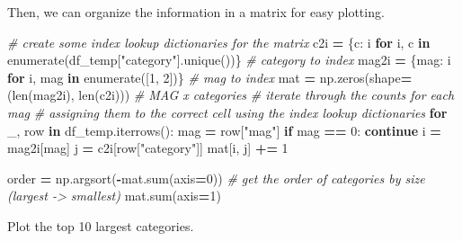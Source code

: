 \documentclass[
]{book}
\newenvironment{Shaded}{\begin{snugshade}}{\end{snugshade}}
\newcommand{\BuiltInTok}[1]{#1}
\newcommand{\CommentTok}[1]{\textcolor[rgb]{0.56,0.35,0.01}{\textit{#1}}}
\newcommand{\ControlFlowTok}[1]{\textcolor[rgb]{0.13,0.29,0.53}{\textbf{#1}}}
\newcommand{\DecValTok}[1]{\textcolor[rgb]{0.00,0.00,0.81}{#1}}
\newcommand{\KeywordTok}[1]{\textcolor[rgb]{0.13,0.29,0.53}{\textbf{#1}}}
\newcommand{\NormalTok}[1]{#1}
\newcommand{\OperatorTok}[1]{\textcolor[rgb]{0.81,0.36,0.00}{\textbf{#1}}}
\newcommand{\StringTok}[1]{\textcolor[rgb]{0.31,0.60,0.02}{#1}}
\begin{document}
Then, we can organize the information in a matrix for easy plotting.

\begin{Shaded}
\begin{Highlighting}[numbers=left,,]
\CommentTok{\# create some index lookup dictionaries for the matrix}
\NormalTok{c2i }\OperatorTok{=}\NormalTok{ \{c: i }\ControlFlowTok{for}\NormalTok{ i, c }\KeywordTok{in} \BuiltInTok{enumerate}\NormalTok{(df\_temp[}\StringTok{"category"}\NormalTok{].unique())\}    }\CommentTok{\# category to index}
\NormalTok{mag2i }\OperatorTok{=}\NormalTok{ \{mag: i }\ControlFlowTok{for}\NormalTok{ i, mag }\KeywordTok{in} \BuiltInTok{enumerate}\NormalTok{([}\DecValTok{1}\NormalTok{, }\DecValTok{2}\NormalTok{])\}                    }\CommentTok{\# mag to index}
\NormalTok{mat }\OperatorTok{=}\NormalTok{ np.zeros(shape}\OperatorTok{=}\NormalTok{(}\BuiltInTok{len}\NormalTok{(mag2i), }\BuiltInTok{len}\NormalTok{(c2i))) }\CommentTok{\# MAG x categories}
\CommentTok{\# iterate through the counts for each mag}
\CommentTok{\# assigning them to the correct cell using the index lookup dictionaries}
\ControlFlowTok{for}\NormalTok{ \_, row }\KeywordTok{in}\NormalTok{ df\_temp.iterrows():}
\NormalTok{    mag }\OperatorTok{=}\NormalTok{ row[}\StringTok{"mag"}\NormalTok{]}
    \ControlFlowTok{if}\NormalTok{ mag }\OperatorTok{==} \DecValTok{0}\NormalTok{: }\ControlFlowTok{continue}
\NormalTok{    i }\OperatorTok{=}\NormalTok{ mag2i[mag]}
\NormalTok{    j }\OperatorTok{=}\NormalTok{ c2i[row[}\StringTok{"category"}\NormalTok{]]}
\NormalTok{    mat[i, j] }\OperatorTok{+=} \DecValTok{1}

\NormalTok{order }\OperatorTok{=}\NormalTok{ np.argsort(}\OperatorTok{{-}}\NormalTok{mat.}\BuiltInTok{sum}\NormalTok{(axis}\OperatorTok{=}\DecValTok{0}\NormalTok{)) }\CommentTok{\# get the order of categories by size (largest {-}\textgreater{} smallest)}
\NormalTok{mat.}\BuiltInTok{sum}\NormalTok{(axis}\OperatorTok{=}\DecValTok{1}\NormalTok{)}
\end{Highlighting}
\end{Shaded}

Plot the top 10 largest categories.
\end{document}
